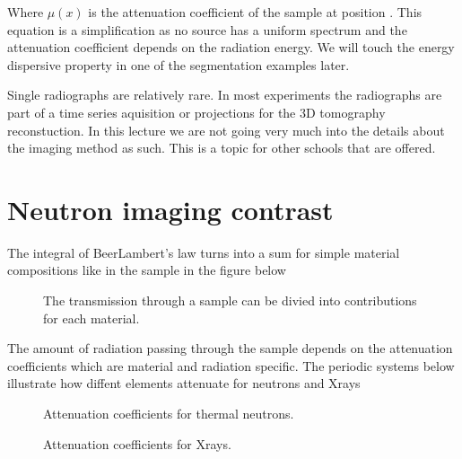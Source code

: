 \documentclass[letterpaper,10pt,english]{sphinxmanual}
\begin{document}
Where \(\mu(x)\) is the attenuation coefficient of the sample at position . This equation is a simplification as no source has a uniform spectrum and the attenuation coefficient depends on the radiation energy. We will touch the energy dispersive property in one of the segmentation examples later.

Single radiographs are relatively rare. In most experiments the radiographs are part of a time series aquisition or projections for the 3D tomography reconstuction. In this lecture we are not going very much into the details about the imaging method as such. This is a topic for other schools that are offered.


\section{Neutron imaging contrast}
\label{\detokenize{ML4NeutronImageSegmentation:neutron-imaging-contrast}}
The integral of Beer\sphinxhyphen{}Lambert’s law turns into a sum for simple material compositions like in the sample in the figure below

\begin{figure}[htbp]
\centering
\capstart

\noindent{}
\caption{The transmission through a sample can be divied into contributions for each material.}\label{\detokenize{ML4NeutronImageSegmentation:id3}}\end{figure}

The amount of radiation passing through the sample depends on the attenuation coefficients which are material and radiation specific. The periodic systems below illustrate how diffent elements attenuate for neutrons and X\sphinxhyphen{}rays

\begin{figure}[htbp]
\centering
\capstart

\noindent{}
\caption{Attenuation coefficients for thermal neutrons.}\label{\detokenize{ML4NeutronImageSegmentation:id4}}\end{figure}

\begin{figure}[htbp]
\centering
\capstart

\noindent{}
\caption{Attenuation coefficients for X\sphinxhyphen{}rays.}\label{\detokenize{ML4NeutronImageSegmentation:id5}}\end{figure}
\end{document}
